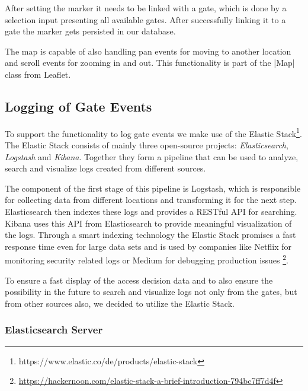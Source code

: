 After setting the marker it needs to be linked with a gate, which is done by a selection input presenting all available gates. After successfully linking it to a gate the marker gets persisted in our database.

The map is capable of also handling pan events for moving to another location and scroll events for zooming in and out. This functionality is part of the |Map| class from Leaflet.

\subsection{Logging of Gate Events}
\label{Logging of Gate Events}

To support the functionality to log gate events we make use of the Elastic Stack\footnote{https://www.elastic.co/de/products/elastic-stack}.
The Elastic Stack consists of mainly three open-source projects: \emph{Elasticsearch}, \emph{Logstash} and \emph{Kibana}.
Together they form a pipeline that can be used to analyze, search and visualize logs created from different sources. 

The component of the first stage of this pipeline is Logstash, which is responsible for collecting data from different locations and transforming it for the next step. Elasticsearch then indexes these logs and provides a RESTful API for searching. Kibana uses this API from Elasticsearch to provide meaningful visualization of the logs.
Through a smart indexing technology the Elastic Stack promises a fast response time even for large data sets and is used by companies like Netflix for monitoring security related logs or Medium for debugging production issues \footnote{\url{https://hackernoon.com/elastic-stack-a-brief-introduction-794bc7ff7d4f}}.

To ensure a fast display of the access decision data and to also ensure the possibility in the future to search and visualize logs not only from the gates, but from other sources also, we decided to utilize the Elastic Stack.

\subsubsection{Elasticsearch Server}

